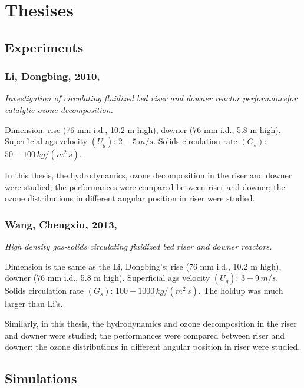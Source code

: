 \chapter{Thesises}
\section{Experiments}
%
%
\subsection[Li, Dongbing, 2010]{Li, Dongbing, 2010, \cite{li2010}}
\textit{Investigation of circulating fluidized bed riser and downer reactor performancefor catalytic ozone decomposition.}

Dimension: rise (76 mm i.d., 10.2 m high), downer (76 mm i.d., 5.8 m high). Superficial ags velocity $(U_g)$: $2-5\,\si{m/s}$. 
Solids circulation rate $(G_s)$: $50-100\,\si{kg/(m^2\,s)}$.

In this thesis, the hydrodynamics, ozone decomposition in the riser and downer were studied; 
the performances were compared between riser and downer; 
the ozone distributions in different angular position in riser were studied.

%
%
\subsection[Wang, Chengxiu, 2013]{Wang, Chengxiu, 2013, \cite{wangcx2013}}
\textit{High density gas-solids circulating fluidized bed riser and downer reactors.}

Dimension is the same as the Li, Dongbing's: rise (76 mm i.d., 10.2 m high), downer (76 mm i.d., 5.8 m high). 
Superficial ags velocity $(U_g)$: $3-9\,\si{m/s}$. 
Solids circulation rate $(G_s)$: $100-1000\,\si{kg/(m^2\,s)}$. 
The holdup was much larger than Li's.

Similarly, in this thesis, the hydrodynamics and ozone decomposition in the riser and downer were studied;
the performances were compared between riser and downer; 
the ozone distributions in different angular position in riser were studied.

\section{Simulations}
%
%
